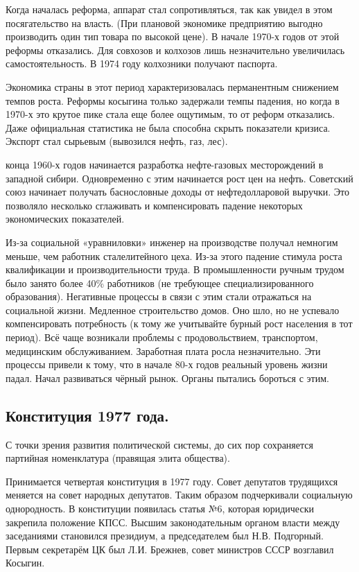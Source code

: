 Когда началась реформа, аппарат стал сопротивляться, так как увидел в этом посягательство на власть. (При плановой экономике предприятию выгодно производить один тип товара по высокой цене). В начале 1970-х годов от этой реформы отказались. Для совхозов и колхозов лишь незначительно увеличилась самостоятельность. В 1974 году колхозники получают паспорта.

Экономика страны в этот период характеризовалась перманентным снижением темпов роста. Реформы косыгина только задержали темпы падения, но когда в 1970-х это крутое пике стала еще более ощутимым, то от реформ отказались. Даже официальная статистика не была способна скрыть показатели кризиса. Экспорт стал сырьевым (вывозился нефть, газ, лес). 

 конца 1960-х годов начинается разработка нефте-газовых месторождений в западной сибири. Одновременно с этим начинается рост цен на нефть. Советский союз начинает получать баснословные доходы от нефтедолларовой выручки. Это позволяло несколько сглаживать и компенсировать падение некоторых экономических показателей.

 Из-за социальной «уравниловки» инженер на производстве получал немногим меньше, чем работник сталелитейного цеха. Из-за этого падение стимула роста квалификации и производительности труда. В промышленности ручным трудом было занято более 40\% работников (не требующее специализированного образования). Негативные процессы в связи с этим стали отражаться на социальной жизни. Медленное строительство домов. Оно шло, но не успевало компенсировать потребность (к тому же учитывайте бурный рост населения в тот период). Всё чаще возникали проблемы с продовольствием, транспортом, медицинским обслуживанием. Заработная плата росла незначительно. Эти процессы привели к тому, что в начале 80-х годов реальный уровень жизни падал. Начал развиваться чёрный рынок. Органы пытались бороться с этим. 


\subsection{Конституция 1977 года.}

С точки зрения развития политической системы, до сих пор сохраняется партийная номенклатура (правящая элита общества). 

Принимается четвертая конституция в 1977 году. Совет депутатов трудящихся меняется на совет народных депутатов. Таким образом подчеркивали социальную однородность. В конституции появилась статья №6, которая юридически закрепила положение КПСС. Высшим законодательным органом власти между заседаниями становился президиум, а председателем был Н.В. Подгорный. Первым секретарём ЦК был Л.И. Брежнев, совет министров СССР возглавил Косыгин.

